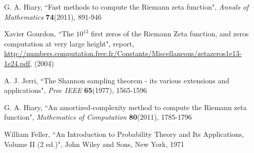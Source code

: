 \documentclass[twoside]{article}
\begin{document}
\begin{thebibliography}{10}
 G. A. Hiary,
``Fast methods to compute the Riemann zeta function",
{\it Annals of Mathematics} {\bf74}(2011), 891-946

 Xavier Gourdon,
``The $10^{13}$ first zeros of the Riemann Zeta function,
and zeros computation at very large height", report,
\url{http://numbers.computation.free.fr/Constants/Miscellaneous/zetazeros1e13-1e24.pdf}, (2004)

 A. J. Jerri,
``The Shannon sampling theorem - its various extensions and applications",
{\it Proc IEEE} {\bf65}(1977), 1565-1596

 G. A. Hiary,
``An amortized-complexity method to compute the Riemann zeta function", 
{\it Mathematics of Computation} {\bf80}(2011), 1785-1796

 William Feller,
``An Introduction to Probability Theory and Its Applications, Volume II (2 ed.)",
John Wiley and Sons, New York, 1971


\end{thebibliography} 
\end{document}
